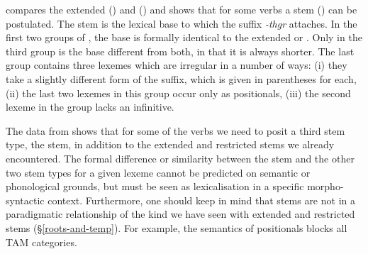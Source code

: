  compares the extended (\Ext) and  (\Rs) and shows that for some verbs a  stem (\Pos) can be postulated. The  stem is the lexical base to which the  suffix \emph{-thgr} attaches. In the first two groups of , the base is formally identical to the extended or . Only in the third group is the base different from both, in that it is always shorter. The last group contains three lexemes which are irregular in a number of ways: (i) they take a slightly different form of the  suffix, which is given in parentheses for each, (ii) the last two lexemes in this group occur only as positionals, (iii) the second lexeme in the group lacks an infinitive.

The data from  shows that for some of the verbs we need to posit a third stem type, the  stem, in addition to the extended and restricted stems we already encountered. The formal difference or similarity between the  stem and the other two stem types for a given lexeme cannot be predicted on semantic or phonological grounds, but must be seen as lexicalisation in a specific morpho-syntactic context. Furthermore, one should keep in mind that  stems are not in a paradigmatic relationship of the kind we have seen with extended and restricted stems ({\S}\ref{roots-and-temp}). For example, the  semantics of positionals blocks all  TAM categories.


